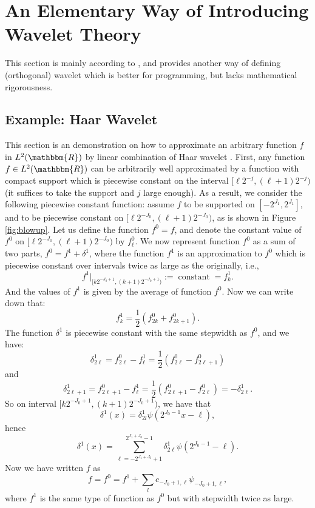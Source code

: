 \documentclass{book}
\newcommand{\assign}{:=}
\newcommand{\tmop}[1]{\ensuremath{\operatorname{#1}}}
\begin{document}
\section{An Elementary Way of Introducing Wavelet Theory}

This section is mainly according to
{\cite{WangJizeng2001,williams1994introduction}}, and provides another way of
defining (orthogonal) wavelet which is better for programming, but lacks
mathematical rigorousness.

\subsection{Example: Haar Wavelet}

\label{haarWavelet}This section is an demonstration on how to approximate an
arbitrary function $f$ in $L^2 (\mathbbm{R})$ by linear combination of Haar
wavelet {\cite{daubechies1992ten}}. First, any function $f \in L^2
(\mathbbm{R})$ can be arbitrarily well approximated by a function with compact
support which is piecewise constant on the interval $[\ell 2^{- j}, (\ell + 1)
2^{- j})$ (it suffices to take the support and $j$ large enough). As a result,
we consider the following piecewise constant function: assume $f$ to be
supported on $[- 2^{J_1}, 2^{J_1}]$, and to be piecewise constant on $[\ell
2^{- J_0}, (\ell + 1) 2^{- J_0})$, as is shown in Figure \ref{fig:blowup}. Let
us define the function $f^0 = f$, and denote the constant value of $f^0$ on
$[\ell 2^{- J_0}, (\ell + 1) 2^{- J_0})$ by $f^0_{\ell}$. We now represent
function $f^0$ as a sum of two parts, $f^0 = f^1 + \delta^1$, where the
function $f^1$ is an approximation to $f^0$ which is piecewise constant over
intervals twice as large as the originally, i.e.,
\[ f^1 |_{[k 2^{- J_0 + 1}, (k + 1) 2^{- J_0 + 1})} \assign \tmop{constant} =
   f_k^1 . \]
And the values of $f^1$ is given by the average of function $f^0$. Now we can
write down that:
\begin{equation}
  f_k^1 = \frac{1}{2} (f_{2 k}^0 + f_{2 k + 1}^0) .
\end{equation}
The function $\delta^1$ is piecewise constant with the same stepwidth as
$f^0$, and we have:
\begin{equation}
  \delta_{2 \ell}^1 = f_{2 \ell}^0 - f_{\ell}^1 = \frac{1}{2} (f_{2 \ell}^0 -
  f_{2 \ell + 1}^0)
\end{equation}
and
\begin{equation}
  \delta_{2 \ell + 1}^1 = f_{2 \ell + 1}^0 - f_{\ell}^1 = \frac{1}{2} (f_{2
  \ell + 1}^0 - f_{2 \ell^{}}^0) = - \delta_{2 \ell}^1 .
\end{equation}
So on interval $[k 2^{- J_0 + 1}, (k + 1) 2^{- J_0 + 1})$, we have that
\[ \delta^1 (x) = \delta_{2 l}^1 \psi (2^{J_0 - 1} x - \ell), \]
hence
\begin{equation}
  \delta^1 (x) = \sum_{\ell = - 2^{J_1 + J_0} + 1}^{2^{J_1 + J_0} - 1}
  \delta^1_{2 \ell} \psi (2^{J_0 - 1} - \ell) .
\end{equation}
Now we have written $f$ as
\[ f = f^0 = f^1 + \sum_l c_{- J_0 + 1, \ell} \psi_{- J_0 + 1, \ell}, \]
where $f^1$ is the same type of function as $f^0$ but with stepwidth twice as
large.
\end{document}
